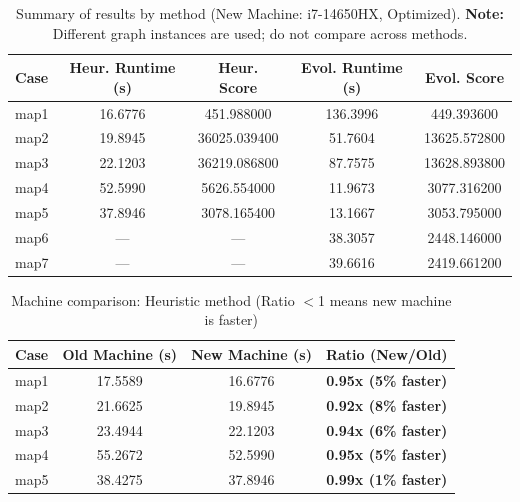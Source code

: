 \documentclass[onecolumn,a4paper,12pt]{IEEEtran}
\begin{document}
\begin{table}[h]
\centering
\caption{Summary of results by method (New Machine: i7-14650HX, Optimized). \textbf{Note:} Different graph instances are used; do not compare across methods.}
\label{tab:summary_new}
\begin{tabular}{lcccc}
\toprule
Case & Heur. Runtime (s) & Heur. Score & Evol. Runtime (s) & Evol. Score \\
\midrule
map1 & 16.6776 & 451.988000 & 136.3996 & 449.393600 \\
map2 & 19.8945 & 36025.039400 & 51.7604 & 13625.572800 \\
map3 & 22.1203 & 36219.086800 & 87.7575 & 13628.893800 \\
map4 & 52.5990 & 5626.554000 & 11.9673 & 3077.316200 \\
map5 & 37.8946 & 3078.165400 & 13.1667 & 3053.795000 \\
map6 & --- & --- & 38.3057 & 2448.146000 \\
map7 & --- & --- & 39.6616 & 2419.661200 \\
\bottomrule
\end{tabular}
\end{table}

\begin{table}[h]
\centering
\caption{Machine comparison: Heuristic method (Ratio $<$1 means new machine is faster)}
\label{tab:mach_heur}
\begin{tabular}{lccc}
\toprule
Case & Old Machine (s) & New Machine (s) & Ratio (New/Old) \\
\midrule
map1 & 17.5589 & 16.6776 & \textbf{0.95x (5\% faster)} \\
map2 & 21.6625 & 19.8945 & \textbf{0.92x (8\% faster)} \\
map3 & 23.4944 & 22.1203 & \textbf{0.94x (6\% faster)} \\
map4 & 55.2672 & 52.5990 & \textbf{0.95x (5\% faster)} \\
map5 & 38.4275 & 37.8946 & \textbf{0.99x (1\% faster)} \\
\bottomrule
\end{tabular}
\end{table}
\end{document}
